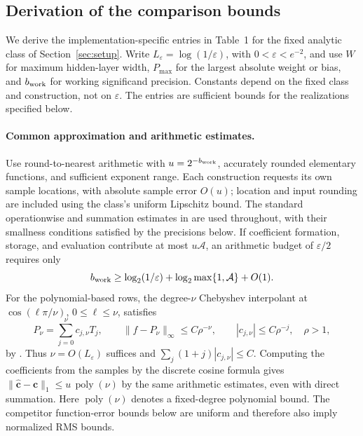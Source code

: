 \providecommand{\qeqref}[1]{(\ref{#1})}
\providecommand{\ComparisonTable}{Table~1}

\subsection{Derivation of the comparison bounds}
\label{app:comparison-bounds}

We derive the implementation-specific entries in \ComparisonTable{} for the
fixed analytic class of Section~\ref{sec:setup}. Write
$L_\varepsilon=\log(1/\varepsilon)$, with $0<\varepsilon<e^{-2}$, and use
$W$ for maximum hidden-layer width, $P_{\max}$ for the largest absolute
weight or bias, and $b_{\rm work}$ for working significand precision. Constants depend on the fixed class and
construction, not on $\varepsilon$. The entries are sufficient bounds for the
realizations specified below.

\paragraph{Common approximation and arithmetic estimates.}
Use round-to-nearest arithmetic with $u=2^{-b_{\rm work}}$, accurately rounded
elementary functions, and sufficient exponent range. Each construction
requests its own sample locations, with absolute sample error $O(u)$; location
and input rounding are included using the class's uniform Lipschitz bound.
The standard operationwise and summation estimates in
\cite[Chs.~2--4]{Higham2002} are used throughout, with their smallness
conditions satisfied by the precisions below. If coefficient formation,
storage, and evaluation contribute at most $u\mathcal A$, an arithmetic
budget of $\varepsilon/2$ requires only
\begin{equation}
 b_{\rm work}\ge\log_2(1/\varepsilon)
       +\log_2\max\{1,\mathcal A\}+O(1).
 \label{eq:table-precision}
\end{equation}
For the polynomial-based rows, the degree-$\nu$ Chebyshev interpolant at
$\cos(\ell\pi/\nu)$, $0\le\ell\le\nu$, satisfies
\begin{equation}
 P_\nu=\sum_{j=0}^{\nu}c_{j,\nu}T_j,
 \qquad \|f-P_\nu\|_\infty\le C\rho^{-\nu},
 \qquad |c_{j,\nu}|\le C\rho^{-j},\quad \rho>1,
 \label{eq:cmp-chebyshev}
\end{equation}
by \cite[Chs.~4 and~8]{trefethen2019atap}. Thus $\nu=O(L_\varepsilon)$
suffices and $\sum_j(1+j)|c_{j,\nu}|\le C$. Computing the coefficients
from the samples by the discrete cosine formula gives
$\|\widehat{\boldsymbol c}-\boldsymbol c\|_1\le u\,\operatorname{poly}(\nu)$
by the same arithmetic estimates, even with direct summation. Here
$\operatorname{poly}(\nu)$ denotes a fixed-degree polynomial bound. The competitor
function-error bounds below are uniform and therefore also imply normalized
RMS bounds.

